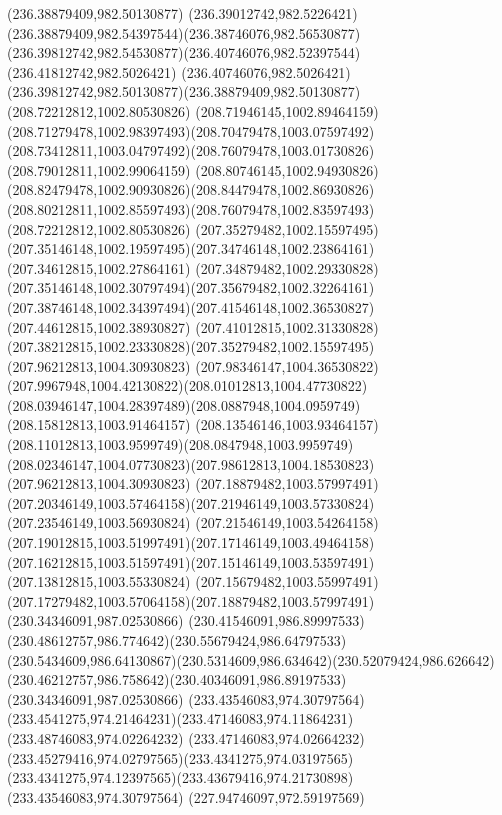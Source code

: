 {{  \moveto(236.38879409,982.50130877)
  \curveto(236.39012742,982.5226421)(236.38879409,982.54397544)(236.38746076,982.56530877)
  \curveto(236.39812742,982.54530877)(236.40746076,982.52397544)(236.41812742,982.5026421)
  \curveto(236.40746076,982.5026421)(236.39812742,982.50130877)(236.38879409,982.50130877)
  \moveto(208.72212812,1002.80530826)
  \curveto(208.71946145,1002.89464159)(208.71279478,1002.98397493)(208.70479478,1003.07597492)
  \curveto(208.73412811,1003.04797492)(208.76079478,1003.01730826)(208.79012811,1002.99064159)
  \curveto(208.80746145,1002.94930826)(208.82479478,1002.90930826)(208.84479478,1002.86930826)
  \curveto(208.80212811,1002.85597493)(208.76079478,1002.83597493)(208.72212812,1002.80530826)
  \moveto(207.35279482,1002.15597495)
  \curveto(207.35146148,1002.19597495)(207.34746148,1002.23864161)(207.34612815,1002.27864161)
  \curveto(207.34879482,1002.29330828)(207.35146148,1002.30797494)(207.35679482,1002.32264161)
  \curveto(207.38746148,1002.34397494)(207.41546148,1002.36530827)(207.44612815,1002.38930827)
  \curveto(207.41012815,1002.31330828)(207.38212815,1002.23330828)(207.35279482,1002.15597495)
  \moveto(207.96212813,1004.30930823)
  \curveto(207.98346147,1004.36530822)(207.9967948,1004.42130822)(208.01012813,1004.47730822)
  \curveto(208.03946147,1004.28397489)(208.0887948,1004.0959749)(208.15812813,1003.91464157)
  \curveto(208.13546146,1003.93464157)(208.11012813,1003.9599749)(208.0847948,1003.9959749)
  \curveto(208.02346147,1004.07730823)(207.98612813,1004.18530823)(207.96212813,1004.30930823)
  \moveto(207.18879482,1003.57997491)
  \curveto(207.20346149,1003.57464158)(207.21946149,1003.57330824)(207.23546149,1003.56930824)
  \curveto(207.21546149,1003.54264158)(207.19012815,1003.51997491)(207.17146149,1003.49464158)
  \curveto(207.16212815,1003.51597491)(207.15146149,1003.53597491)(207.13812815,1003.55330824)
  \curveto(207.15679482,1003.55997491)(207.17279482,1003.57064158)(207.18879482,1003.57997491)
  \moveto(230.34346091,987.02530866)
  \curveto(230.41546091,986.89997533)(230.48612757,986.774642)(230.55679424,986.64797533)
  \curveto(230.5434609,986.64130867)(230.5314609,986.634642)(230.52079424,986.626642)
  \curveto(230.46212757,986.758642)(230.40346091,986.89197533)(230.34346091,987.02530866)
  \moveto(233.43546083,974.30797564)
  \curveto(233.4541275,974.21464231)(233.47146083,974.11864231)(233.48746083,974.02264232)
  \curveto(233.47146083,974.02664232)(233.45279416,974.02797565)(233.4341275,974.03197565)
  \curveto(233.4341275,974.12397565)(233.43679416,974.21730898)(233.43546083,974.30797564)
  \moveto(227.94746097,972.59197569)
}}
